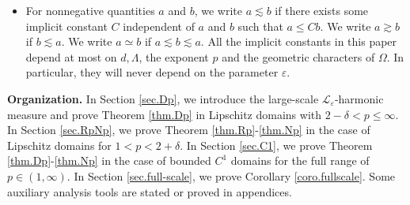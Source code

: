 \documentclass[reqno,12pt]{amsart} %
\theoremstyle{definition}
\theoremstyle{remark}
\numberwithin{equation}{section}
\newcommand{\cL}{\mathcal{L}}
\newcommand{\R}{\mathbb{R}}
\newcommand{\e}{\varepsilon}
\begin{document}
\begin{itemize}



    

    \item For nonnegative quantities $a$ and $b$, we write $a\lesssim b$ if there exists some implicit constant $C$ independent of $a$ and $b$ such that $a\leq C b$. We write $a \gtrsim b$ if $b \lesssim a$. We write $a \simeq b$ if $a \lesssim b \lesssim a$. All the implicit constants in this paper depend at most on $d, \Lambda$, the exponent $p$ and the geometric characters of $\Omega$. In particular, they will never depend on the parameter $\e$.
    \end{itemize}

\textbf{Organization.} In Section \ref{sec.Dp}, we introduce the large-scale $\cL_\e$-harmonic measure and prove Theorem \ref{thm.Dp} in Lipschitz domains with $2-\delta<p\le \infty$. In Section \ref{sec.RpNp}, we prove Theorem \ref{thm.Rp}-\ref{thm.Np} in the case of Lipschitz domains for $1<p<2+\delta$. In Section \ref{sec.C1}, we prove Theorem \ref{thm.Dp}-\ref{thm.Np} in the case of bounded $C^1$ domains for the full range of $p\in (1,\infty)$. In Section \ref{sec.full-scale}, we prove Corollary \ref{coro.fullscale}. Some auxiliary analysis tools are stated or proved in appendices.
\end{document}
